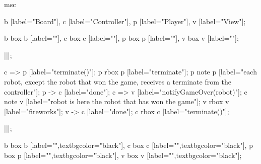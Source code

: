 \begin{msc}
msc
{

b [label="Board"],
c [label="Controller"],
p [label="Player"],
v [label="View"];

b box b [label=""],
c box c [label=""],
p box p [label=""],
v box v [label=""];

|||;

c => p [label="terminate()"];
p rbox p [label="terminate"];
p note p [label="each robot, except the robot that won the game, receives a terminate from the controller"];
p -> c [label="done"];
c => v [label="notifyGameOver(robot)"];
c note v [label="robot is here the robot that has won the game"];
v rbox v [label="fireworks"];
v -> c [label="done"];
c rbox c [label="terminate()"];

|||;

b box b [label="",textbgcolor="black"],
c box c [label="",textbgcolor="black"],
p box p [label="",textbgcolor="black"],
v box v [label="",textbgcolor="black"];

}
\end{msc}
